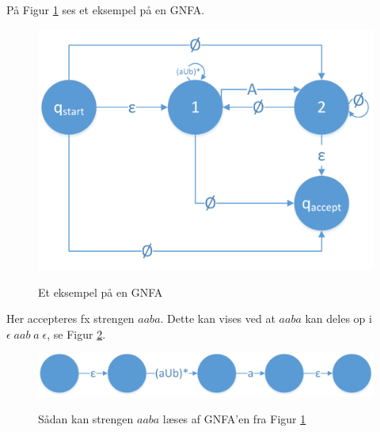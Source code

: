 \documentclass[a4paper,10pt,article]{memoir}
\begin{document}
\begin{eksempel}
På Figur \ref{fig:fig17} ses et eksempel på en GNFA.

\begin{figure}[H]%
{\centering 
\includegraphics[width=\textwidth]{Fig17x.png}
} \caption{Et eksempel på en GNFA}
\label{fig:fig17}
\end{figure}

Her accepteres fx strengen $aaba$. Dette kan vises ved at $aaba$ kan
deles op i $\epsilon \; a a b \; a \; \epsilon$, se Figur
\ref{fig:fig18}.

\begin{figure}[H]%
{\centering 
\includegraphics[width=\textwidth]{Fig18x.png}
} \caption{Sådan kan strengen $aaba$ læses af GNFA'en fra Figur
  \ref{fig:fig17}}
\label{fig:fig18}
\end{figure}
\end{eksempel}
\end{document}
